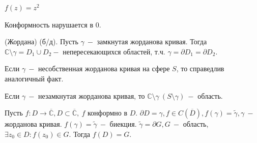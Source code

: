  $f(z) = z^2$

Конформность нарушается в 0.

 (Жордана) (б/д). Пусть $\gamma \ -$ замкнутая жорданова кривая. Тогда $\mathbb{C}\setminus \gamma = D_1 \cup D_2 -$ непересекающихся областей, т.ч. $\gamma = \partial D_1 = \partial D_2$.

Если $\gamma \ - $ несобственная жорданова кривая на сфере $S$, то справедлив аналогичный факт.

Если $\gamma \ - $ незамкнутая жорданова кривая, то $\mathbb{C} \setminus \gamma \ (S \setminus \gamma) \ - $ область.

 Пусть $f: D \to \overline{\mathbb{C}}, D \subset \overline{\mathbb{C}}, \ f$ конформно в $D$. $\partial D = \gamma, f\in C(\overline{D}), f(\gamma) = \tilde{\gamma}, \gamma \ -$ жорданова кривая. $f(\gamma)=\tilde\gamma \ -$ биекция. $\tilde\gamma = \partial G, G \ -$ область, $\exists z_0\in D: f(z_0)\in G.$ Тогда $f(D)=G$.
